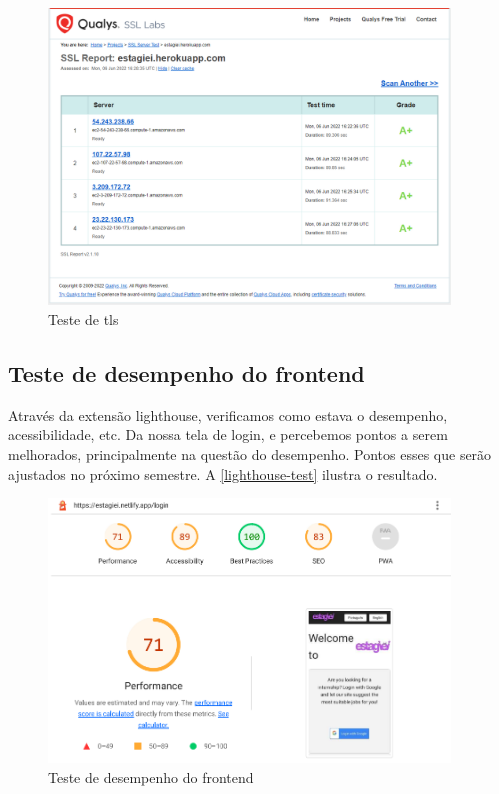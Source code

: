 \begin{figure}[H]
	\centering
	\caption{\label{grade-server-test}Teste de \ac{tls}}
	\includegraphics[width=0.95\textwidth]{../imagens/web-tests/grade-server-test.png}
\end{figure}

\subsection{Teste de desempenho do \gls{frontend}}
Através da extensão \gls{lighthouse}, verificamos como estava o desempenho, acessibilidade, etc. Da nossa tela de login, e percebemos pontos a serem melhorados, principalmente na questão do desempenho. Pontos esses que serão ajustados no próximo semestre. A \autoref{lighthouse-test} ilustra o resultado.

\begin{figure}[H]
	\centering
	\caption{\label{lighthouse-test}Teste de desempenho do \gls{frontend}}
	\includegraphics[width=0.95\textwidth]{../imagens/web-tests/lighthouse-test.png}
\end{figure}

